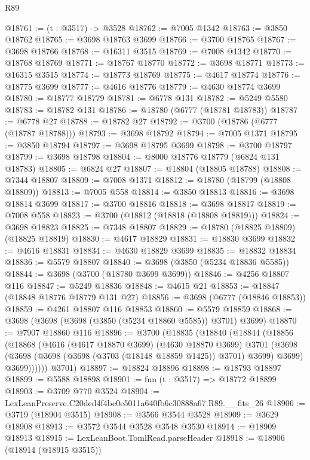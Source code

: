 \begin{lexlean}{R89}
\begin{coremodule}
@18761 := (t : @3517) -> @3528
@18762 := @7005 @1342
@18763 := @3850 @18762
@18765 := @3698 @18763 @3699
@18766 := @3700 @18765
@18767 := @3698 @18766
@18768 := @16311 @3515
@18769 := @7008 @1342
@18770 := @18768 @18769
@18771 := @18767 @18770
@18772 := @3698 @18771
@18773 := @16315 @3515
@18774 := @18773 @18769
@18775 := @4617 @18774
@18776 := @18775 @3699
@18777 := @4616 @18776
@18779 := @4630 @18774 @3699
@18780 := @18777 @18779
@18781 := @6778 @131
@18782 := @5249 @5580
@18783 := @18782 @131
@18786 := @18780 (@6777 (@18781 @18783))
@18787 := @6778 @27
@18788 := @18782 @27
@18792 := @3700 (@18786 (@6777 (@18787 @18788)))
@18793 := @3698 @18792
@18794 := @7005 @1371
@18795 := @3850 @18794
@18797 := @3698 @18795 @3699
@18798 := @3700 @18797
@18799 := @3698 @18798
@18804 := @8000 @18776 @18779 (@6824 @131 @18783)
@18805 := @6824 @27
@18807 := @18804 (@18805 @18788)
@18808 := @7344 @18807
@18809 := @7008 @1371
@18812 := @18780 (@18799 (@18808 @18809))
@18813 := @7005 @558
@18814 := @3850 @18813
@18816 := @3698 @18814 @3699
@18817 := @3700 @18816
@18818 := @3698 @18817
@18819 := @7008 @558
@18823 := @3700 (@18812 (@18818 (@18808 @18819)))
@18824 := @3698 @18823
@18825 := @7348 @18807
@18829 := @18780 (@18825 @18809) (@18825 @18819)
@18830 := @4617 @18829
@18831 := @18830 @3699
@18832 := @4616 @18831
@18834 := @4630 @18829 @3699
@18835 := @18832 @18834
@18836 := @5579 @18807
@18840 := @3698 (@3850 (@5234 @18836 @5585))
@18844 := @3698 (@3700 (@18780 @3699 @3699))
@18846 := @4256 @18807 @116
@18847 := @5249 @18836
@18848 := @4615 @21
@18853 := @18847 (@18848 @18776 @18779 @131 @27)
@18856 := @3698 (@6777 (@18846 @18853))
@18859 := @4261 @18807 @116 @18853
@18860 := @5579 @18859
@18868 := @3698 (@3698 (@3698 (@3850 (@5234 @18860 @5585)) @3701) @3699)
@18870 := @7907 @18860 @116
@18896 := @3700
    (@18835
      (@18840
        (@18844
          (@18856
            (@18868
              (@4616
                (@4617 @18870 @3699)
                (@4630 @18870 @3699)
                @3701
                (@3698
                  (@3698 (@3698 (@3698 (@3703 (@18148 @18859 @1425)) @3701) @3699) @3699)
                  @3699))))))
      @3701)
@18897 := @18824 @18896
@18898 := @18793 @18897
@18899 := @5588 @18898
@18901 := fun (t : @3517) => @18772 @18899
@18903 := @3709 @770 @3524
@18904 := LexLeanPreserve.C20ded4f4be0e5011a640fb6c30888a67.R89.__fits_26
@18906 := @3719 (@18904 @3515)
@18908 := @3566 @3544 @3528
@18909 := @3629 @18908
@18913 := @3572 @3544 @3528 @3548 @3530
@18914 := @18909 @18913
@18915 := LexLeanBoot.TomlRead.parseHeader
@18918 := @18906 (@18914 (@18915 @3515))

\end{coremodule}
\end{lexlean}

